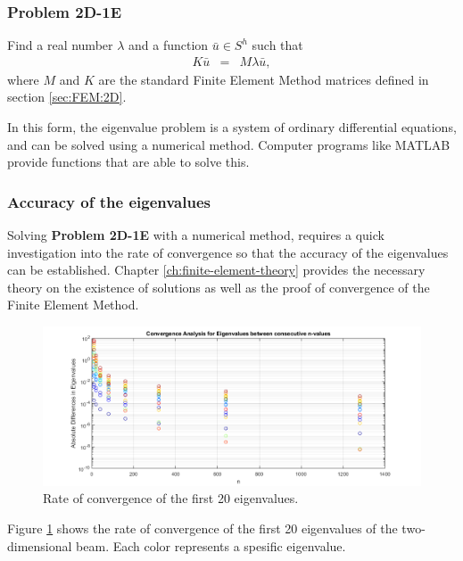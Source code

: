 \documentclass[../../main.tex]{subfiles}
\begin{document}
\subsubsection{Problem 2D-1E}
Find a real number $\lambda$ and a function $\bar{u} \in S^h$ such that
\begin{eqnarray}
	K\bar{u} & = & M\lambda{\bar{u}},
\end{eqnarray} where $M$ and $K$ are the standard Finite Element Method matrices defined in section \ref{sec:FEM:2D}.

In this form, the eigenvalue problem is a system of ordinary differential equations, and can be solved using a numerical method. Computer programs like MATLAB provide functions that are able to solve this.

\subsubsection{Accuracy of the eigenvalues}
Solving \textbf{Problem 2D-1E} with a numerical method, requires a quick investigation into the rate of convergence so that the accuracy of the eigenvalues can be established. Chapter \ref{ch:finite-element-theory} provides the necessary theory on the existence of solutions as well as the proof of convergence of the Finite Element Method.

\begin{figure}[H]
    \centering
    \begin{adjustbox}{center}
        \includegraphics[scale=0.7]{Convergence.png}
    \end{adjustbox}
    \caption{Rate of convergence of the first 20 eigenvalues.}
    \label{fig:conv_2d_eig_chapter6}
\end{figure}


Figure \ref{fig:conv_2d_eig_chapter6} shows the rate of convergence of the first 20 eigenvalues of the two-dimensional beam. Each color represents a spesific eigenvalue.
\end{document}
